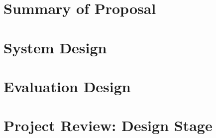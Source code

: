 \section{Summary of Proposal}          \label{desProSum}
\section{System Design}                \label{desSys}
\section{Evaluation Design}            \label{desEval}
\section{Project Review: Design Stage} \label{desReview}
